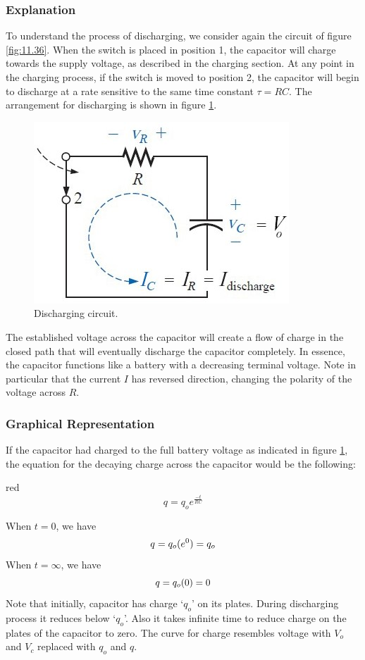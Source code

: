 \subsubsection{Explanation}
To understand the process of discharging, we consider again the circuit of
figure \ref{fig:11.36}. When the switch is placed in position 1,
the capacitor
will charge towards the supply voltage, as described in the charging section.
At any point in the charging process, if the switch is moved to position 2,
the capacitor will begin to discharge at a rate sensitive to the same time
constant $\tau = RC$. The arrangement for discharging is shown in figure
\ref{fig:11.41}.
\begin{figure}[H]
  \centering
  \includegraphics[scale = 0.55]{Images/Chapter-11/11.41}
  \caption{Discharging circuit.}
  \label{fig:11.41}
\end{figure}
The established voltage across the capacitor will create
a flow of charge in the closed path that will eventually discharge the
capacitor completely. In essence, the capacitor functions like a battery
with a decreasing terminal voltage. Note in particular that the current $I$
has reversed direction, changing the polarity of the voltage across $R$.
\subsubsection{Graphical Representation}
If the capacitor had charged to the full battery voltage as indicated in
figure \ref{fig:11.41}, the equation for the decaying charge across the capacitor
would be the following:

\begin{mybox}{red}{}
  \begin{equation}\label{eq:11.92}
    q = q_{o}e^{\frac{-t}{RC}}
  \end{equation}
\end{mybox}
\noindent When $t = 0$, we have
\begin{equation}\notag
  q = q_{o}(e^{0}) = q_{o}
\end{equation}
When $t = \infty$, we have
\begin{equation}\notag
  q = q_{o}(0) = 0
\end{equation}
Note that initially, capacitor has charge `$q_{o}$' on its plates.
During discharging process it reduces below `$q_{o}$'. Also it takes infinite time
to reduce charge on the plates of the capacitor to zero. The curve for
charge resembles voltage with $V_o$ and $V_{c}$ replaced with $q_{o}$ and
$q$. 
